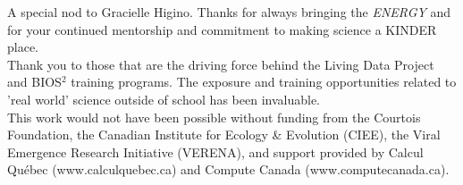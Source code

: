 \documentclass[12pt,twoside,phd]{dms}
\numberwithin{equation}{section}
\numberwithin{table}{chapter}
\numberwithin{figure}{chapter}
\begin{document}
A special nod to Gracielle Higino. Thanks for always bringing the \emph{ENERGY} and for your continued mentorship and  commitment to making science a KINDER place.\\

Thank you to those that are the driving force behind the Living Data Project and BIOS$^2$ training programs. The exposure and training opportunities related to 'real world' science outside of school has been invaluable.\\

This work would not have been possible without funding from the Courtois Foundation, the Canadian Institute for Ecology \& Evolution (CIEE), the Viral Emergence Research Initiative (VERENA), and support provided by Calcul Québec (www.calculquebec.ca) and Compute Canada (www.computecanada.ca).


\NoChapterPageNumber
\cleardoublepage
{}














\appendix



\end{document}
